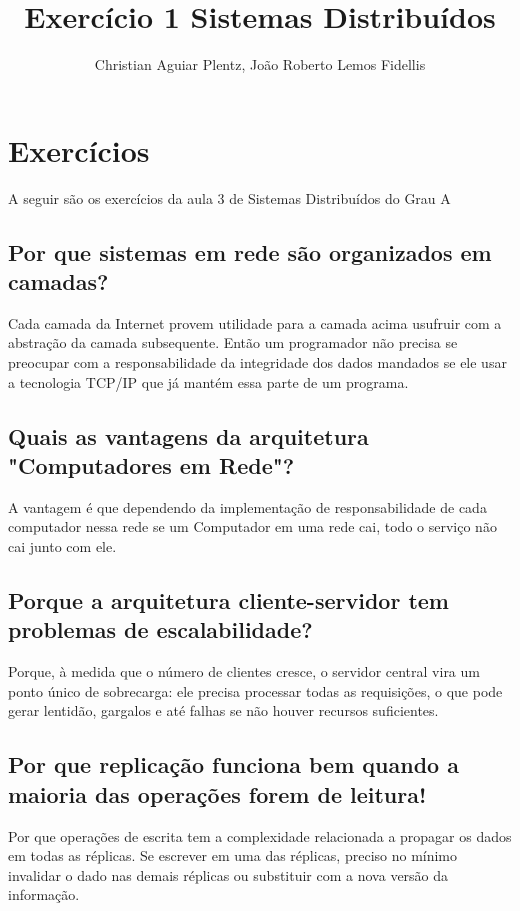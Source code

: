 \documentclass[12pt]{article}
\title{Exercício 1 Sistemas Distribuídos}
\author{Christian Aguiar Plentz\inst{1}, João Roberto Lemos Fidellis\inst{2} }
\begin{document}
 

\maketitle

\section{Exercícios} \label{sec:exercicios}

A seguir são os exercícios da aula 3 de Sistemas Distribuídos do Grau A

\subsection{Por que sistemas em rede são organizados em camadas?}

Cada camada da Internet provem utilidade para a camada acima usufruir com a abstração
da camada subsequente. Então um programador não precisa se preocupar com a responsabilidade
da integridade dos dados mandados se ele usar a tecnologia TCP/IP que já mantém essa parte
de um programa.

\subsection{Quais as vantagens da arquitetura "Computadores em Rede"?} 

A vantagem é que dependendo da implementação de responsabilidade de cada computador nessa rede
se um Computador em uma rede cai, todo o serviço não cai junto com ele.

\subsection{Porque a arquitetura cliente-servidor tem problemas de escalabilidade?}

Porque, à medida que o número de clientes cresce, o servidor central vira um ponto único de sobrecarga: ele precisa processar todas as requisições, o que pode gerar lentidão, gargalos e até falhas se não houver recursos suficientes.

\subsection{Por que replicação funciona bem quando a maioria das operações forem de leitura!} 

Por que operações de escrita tem a complexidade relacionada a propagar os dados em todas as réplicas. Se escrever em uma das réplicas, preciso no mínimo invalidar o dado nas demais réplicas ou substituir com a nova versão da informação.
\end{document}
